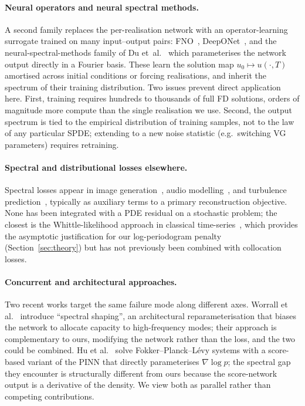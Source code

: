 \documentclass[review,12pt]{elsarticle}
\begin{document}
\paragraph{Neural operators and neural spectral methods.}
A second family replaces the per-realisation network with an
operator-learning surrogate trained on many input--output pairs:
FNO~\cite{Li2021FNO}, DeepONet~\cite{Lu2021DeepONet}, and the
neural-spectral-methods family of Du et~al.~\cite{DuEtAl2024NSM}
which parameterises the network output directly in a Fourier basis.
These learn the solution map \(u_0 \mapsto u(\cdot, T)\) amortised
across initial conditions or forcing realisations, and inherit the
spectrum of their training distribution. Two issues prevent direct
application here. First, training requires hundreds to thousands of
full FD solutions, orders of magnitude more compute than the
single realisation we use. Second, the output spectrum is tied to
the empirical distribution of training samples, not to the law of
any particular SPDE; extending to a new noise statistic (e.g.\
switching VG parameters) requires retraining.

\paragraph{Spectral and distributional losses elsewhere.}
Spectral losses appear in image generation~\cite{Durall2020}, audio
modelling~\cite{Engel2020DDSP}, and turbulence
prediction~\cite{Chakraborty2025BSP}, typically as auxiliary terms to a
primary reconstruction objective. None has been integrated with a
PDE residual on a stochastic problem; the closest is the
Whittle-likelihood approach in classical
time-series~\cite{Whittle1953}, which provides the asymptotic
justification for our log-periodogram penalty
(Section~\ref{sec:theory}) but has not previously been combined
with collocation losses.

\paragraph{Concurrent and architectural approaches.}
Two recent works target the same failure mode along different axes.
Worrall et al.~\cite{Worrall2025SpectralShaping} introduce
``spectral shaping'', an architectural reparameterisation that
biases the network to allocate capacity to high-frequency modes;
their approach is complementary to ours, modifying the network
rather than the loss, and the two could be combined. Hu et
al.~\cite{Hu2024ScoreFPINN} solve Fokker--Planck--L\'evy systems
with a score-based variant of the PINN that directly parameterises
\(\nabla \log p\); the spectral gap they encounter is structurally
different from ours because the score-network output is a derivative
of the density. We view both as parallel rather than competing
contributions.
\end{document}
